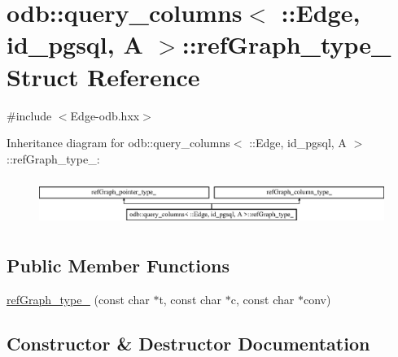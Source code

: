 \hypertarget{structodb_1_1query__columns_3_01_1_1_edge_00_01id__pgsql_00_01_a_01_4_1_1ref_graph__type__}{}\section{odb\+:\+:query\+\_\+columns$<$ \+:\+:Edge, id\+\_\+pgsql, A $>$\+:\+:ref\+Graph\+\_\+type\+\_\+ Struct Reference}
\label{structodb_1_1query__columns_3_01_1_1_edge_00_01id__pgsql_00_01_a_01_4_1_1ref_graph__type__}


{\ttfamily \#include $<$Edge-\/odb.\+hxx$>$}

Inheritance diagram for odb\+:\+:query\+\_\+columns$<$ \+:\+:Edge, id\+\_\+pgsql, A $>$\+:\+:ref\+Graph\+\_\+type\+\_\+\+:\begin{figure}[H]
\begin{center}
\leavevmode
\includegraphics[height=1.559888cm]{d6/d3c/structodb_1_1query__columns_3_01_1_1_edge_00_01id__pgsql_00_01_a_01_4_1_1ref_graph__type__}
\end{center}
\end{figure}
\subsection*{Public Member Functions}
\begin{DoxyCompactItemize}
\item 
\hyperlink{structodb_1_1query__columns_3_01_1_1_edge_00_01id__pgsql_00_01_a_01_4_1_1ref_graph__type___a2f05d1257525cf71b579df7f8a8ce8e6}{ref\+Graph\+\_\+type\+\_\+} (const char $\ast$t, const char $\ast$c, const char $\ast$conv)
\end{DoxyCompactItemize}


\subsection{Constructor \& Destructor Documentation}
\hypertarget{structodb_1_1query__columns_3_01_1_1_edge_00_01id__pgsql_00_01_a_01_4_1_1ref_graph__type___a2f05d1257525cf71b579df7f8a8ce8e6}{}
